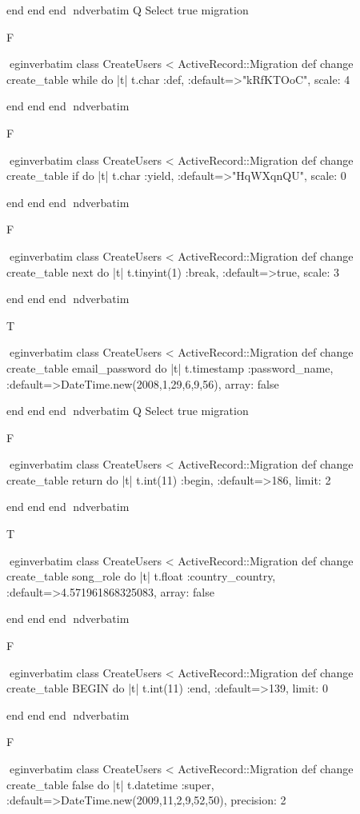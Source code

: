     end 
  end 
end
nd{verbatim}
Q
 Select true migration

F

egin{verbatim}
 class CreateUsers < ActiveRecord::Migration 
  def change 
    create_table while do |t| 
      t.char :def, :default=>"kRfKTOoC", scale: 4
    
    end 
  end 
end
nd{verbatim}

F

egin{verbatim}
 class CreateUsers < ActiveRecord::Migration 
  def change 
    create_table if do |t| 
      t.char :yield, :default=>"HqWXqnQU", scale: 0
    
    end 
  end 
end
nd{verbatim}

F

egin{verbatim}
 class CreateUsers < ActiveRecord::Migration 
  def change 
    create_table next do |t| 
      t.tinyint(1) :break, :default=>true, scale: 3
    
    end 
  end 
end
nd{verbatim}

T

egin{verbatim}
 class CreateUsers < ActiveRecord::Migration 
  def change 
    create_table email_password do |t| 
      t.timestamp :password_name, :default=>DateTime.new(2008,1,29,6,9,56), array: false
    
    end 
  end 
end
nd{verbatim}
Q
 Select true migration

F

egin{verbatim}
 class CreateUsers < ActiveRecord::Migration 
  def change 
    create_table return do |t| 
      t.int(11) :begin, :default=>186, limit: 2
    
    end 
  end 
end
nd{verbatim}

T

egin{verbatim}
 class CreateUsers < ActiveRecord::Migration 
  def change 
    create_table song_role do |t| 
      t.float :country_country, :default=>4.571961868325083, array: false
    
    end 
  end 
end
nd{verbatim}

F

egin{verbatim}
 class CreateUsers < ActiveRecord::Migration 
  def change 
    create_table BEGIN do |t| 
      t.int(11) :end, :default=>139, limit: 0
    
    end 
  end 
end
nd{verbatim}

F

egin{verbatim}
 class CreateUsers < ActiveRecord::Migration 
  def change 
    create_table false do |t| 
      t.datetime :super, :default=>DateTime.new(2009,11,2,9,52,50), precision: 2
    

